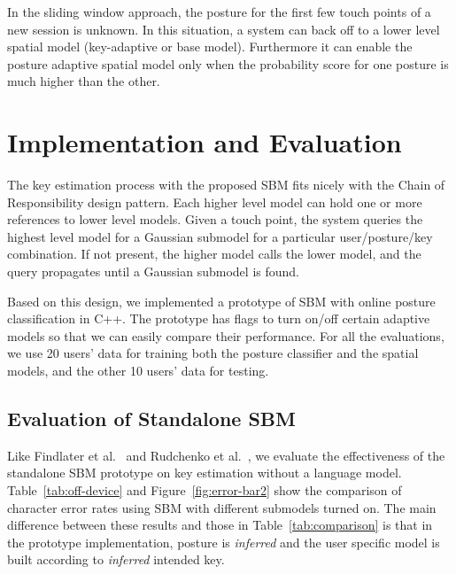 \documentclass{sigchi}
\begin{document}
In the sliding window approach, the posture for the first few touch points  
of a new session is unknown. In this situation, a system can back off to a lower level spatial
model (key-adaptive or base model). Furthermore it can enable the posture
adaptive spatial model only when the probability score for one posture is much
higher than the other.


\section{Implementation and Evaluation}
The key estimation process with the proposed SBM fits nicely with the
Chain of Responsibility design pattern. Each higher level model can
hold one or more references to lower level models. Given a touch
point, the system queries the highest level model for a Gaussian
submodel for a particular user/posture/key combination. If not present,
the higher model calls the lower model, and the
query propagates until a Gaussian submodel is found.

Based on this design, we implemented a prototype of SBM with online posture
classification in C++. The prototype has flags to turn on/off certain adaptive
models so that we can easily compare their performance.
For all the evaluations, we use 20 users' data for training both the posture classifier
and the spatial models, and the other 10 users' data for testing.

\subsection{Evaluation of Standalone SBM}
Like Findlater et al.~\cite{Findlater:2012} and Rudchenko et al.~, we evaluate the effectiveness of the standalone SBM  prototype on key estimation without a language model.
Table~\ref{tab:off-device} and Figure~\ref{fig:error-bar2} show the comparison of
character error rates using SBM with different submodels turned on. The main difference between these results and those in Table~\ref{tab:comparison} is that in the prototype implementation, posture is \textit{inferred} and the user specific model is built according to \textit{inferred} intended key.
\end{document}
